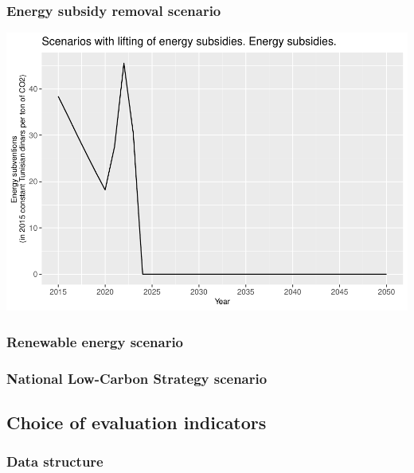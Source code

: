 \documentclass[
]{article}
\begin{document}
\hypertarget{energy-subsidy-removal-scenario}{%
\subsubsection{Energy subsidy removal
scenario}\label{energy-subsidy-removal-scenario}}

\includegraphics{Modele-ThreeMe-Tunisie_Sequeira_Valilou_Wang_files/figure-latex/unnamed-chunk-7-1.pdf}

\hypertarget{renewable-energy-scenario}{%
\subsubsection{Renewable energy
scenario}\label{renewable-energy-scenario}}

\hypertarget{national-low-carbon-strategy-scenario}{%
\subsubsection{National Low-Carbon Strategy
scenario}\label{national-low-carbon-strategy-scenario}}

\hypertarget{choice-of-evaluation-indicators}{%
\subsection{Choice of evaluation
indicators}\label{choice-of-evaluation-indicators}}

\hypertarget{data-structure}{%
\subsubsection{Data structure}\label{data-structure}}
\end{document}

